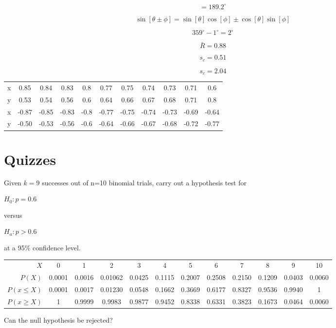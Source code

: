 \documentclass{article}
\begin{document}
\[
= 189.2^\circ
\]

\[
\sin[\theta\pm\phi] = \sin[\theta]\cos[\phi]\pm\cos[\theta]\sin[\phi]
\]

\[
359^\circ - 1^\circ = 2^\circ
\]

\[
\bar{R} = 0.88
\]

\[
s_c = 0.51
\]

\[
s_c = 2.04
\]

\begin{tabular}{c|cccccccccc}
x & 0.85 & 0.84 & 0.83 & 0.8 & 0.77 & 0.75 & 0.74 & 0.73 & 0.71 & 0.6 \\
y & 0.53 & 0.54 & 0.56 & 0.6 & 0.64 & 0.66 & 0.67 & 0.68 & 0.71 & 0.8 \\
\hline
x & -0.87 & -0.85 & -0.83 & -0.8 & -0.77 & -0.75 & -0.74 & -0.73 & -0.69 & -0.64 \\
y & -0.50 & -0.53 & -0.56 & -0.6 & -0.64 & -0.66 & -0.67 & -0.68 & -0.72 & -0.77 \\
\end{tabular}

\clearpage

\section*{Quizzes}

\begin{minipage}{\linewidth}
Given $k=9$ successes out of n=10 binomial trials, carry out a hypothesis test for\medskip

\( H_0: p=0.6\)\medskip

versus\medskip

\( H_a: p > 0.6\)\medskip

at a 95\% confidence level.\medskip

\begin{tabular}{r|ccccccccccc}
  $X$ & 0 & 1 & 2 & 3 & 4 & 5 & 6 & 7 & 8 & 9 & 10 \\
  $P(X)$ & 0.0001 & 0.0016 & 0.01062 & 0.0425 & 0.1115 & 0.2007 &
  0.2508 & 0.2150 & 0.1209 & 0.0403 & 0.0060 \\
  $P(x \leq X)$ & 0.0001 & 0.0017 & 0.01230 & 0.0548 & 0.1662 &
  0.3669 & 0.6177 & 0.8327 & 0.9536 & 0.9940 & 1 \\
  $P(x \geq X)$ & 1 & 0.9999 & 0.9983 & 0.9877 & 0.9452 &
  0.8338 & 0.6331 & 0.3823 & 0.1673 & 0.0464 & 0.0060
\end{tabular}\medskip

Can the null hypothesis be rejected?
\end{minipage}
\end{document}
